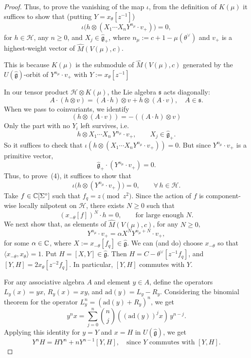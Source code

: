 \documentclass[12pt]{article}
\begin{document}
\begin{proof}
    Thus, to prove the vanishing of the map $\iota$, from the definition of $K(\mu)$ it suffices to show that (putting $Y=x_\theta[z^{-1}]$)
    \[
        \iota\bigl(h\otimes(X_1\cdots X_nY^{n_\mu}\cdot v_+)\bigr)=0,
        \tag{4}
    \]
    for $h\in\mathcal H$, any $n\ge0$, and $X_j\in\widehat{\mathfrak g}_+$,
    where $n_\mu:=c+1-\mu(\theta^\vee)$ and $v_+$ is a highest-weight vector
    of $\widehat M(V(\mu),c)$.

    This is because $K(\mu)$ is the submodule of $\widehat M(V(\mu),c)$ generated by the $U(\widehat{\mathfrak g})$-orbit of $Y^{n_\mu}\cdot v_+$ with $Y:=x_\theta[z^{-1}]$

    In our tensor product $\mathcal H \otimes K(\mu)$, the Lie algebra $\mathfrak s$ acts diagonally:
    \[
        A \cdot (h\otimes v)
        = (A\cdot h)\otimes v + h\otimes (A\cdot v),
        \quad A\in\mathfrak s.
    \]
    When we pass to coinvariants, we identify
    \[
        (h\otimes (A\cdot v)) = -((A\cdot h)\otimes v)
    \]
    Only the part with no $Y_i$ left survives, i.e.
    \[
        h\otimes X_1\cdots X_n\, Y^{n_\mu}\cdot v_+,
        \qquad X_j\in\widehat{\mathfrak g}_+.
    \]
    So it suffices to check that \(\iota(h\otimes (X_1\cdots X_nY^{n_\mu}\cdot v_+))=0\).
    But since \(Y^{n_\mu}\cdot v_+\) is a primitive vector,
    \[
        \widehat{\mathfrak g}_+\cdot(Y^{n_\mu}\cdot v_+)=0.
    \]
    Thus, to prove~(4), it suffices to show that
    \[
        \iota\bigl(h\otimes (Y^{n_\mu}\cdot v_+)\bigr)=0,
        \qquad \forall\,h\in\mathcal H.
        \tag{5}
    \]
    Take $f\in\mathbb{C}[\Sigma^\circ]$ such that $f_q=z\pmod{z^2}$.
    Since the action of $f$ is component-wise locally nilpotent on $\mathcal H$, there exists $N\ge0$ such that
    \[
        (x_{-\theta}[f])^N\cdot h=0,\qquad\text{for large enough $N$.}
        \tag{6}
    \]
    We next show that, as elements of $\widehat M(V(\mu),c)$, for any $N\ge0$,
    \[
        Y^{n_\mu}\cdot v_+ = \alpha X^N Y^{n_\mu+N}\cdot v_+,
        \tag{7}
    \]
    for some $\alpha\in\mathbb{C}$, where $X:=x_{-\theta}[f_q]\in\widehat{\mathfrak g}$.
    We can (and do) choose $x_{-\theta}$ so that
    $\langle x_{-\theta},x_\theta\rangle=1$.
    Put $H=[X,Y]\in\widehat{\mathfrak g}$.
    Then $H=C-\theta^\vee[z^{-1}f_q]$, and
    $[Y,H]=2x_\theta[z^{-2}f_q]$.
    In particular, $[Y,H]$ commutes with $Y$.

    For any associative algebra $A$ and element $y\in A$,
    define the operators $L_y(x)=yx$, $R_y(x)=xy$, and $\mathrm{ad}(y)=L_y-R_y$.
    Considering the binomial theorem for the operator
    $L_y^n=(\mathrm{ad}(y)+R_y)^n$, we get
    \[
        y^n x = \sum_{j=0}^n \binom{n}{j}((\mathrm{ad}(y))^jx)\,y^{n-j}.
        \tag{8}
    \]
    Applying this identity for $y=Y$ and $x=H$ in $U(\widehat{\mathfrak g})$,
    we get
    \[
        Y^nH = HY^n + nY^{n-1}[Y,H],
        \quad\text{since $Y$ commutes with $[Y,H]$.}
        \tag{9}
    \]


\end{proof}
\end{document}
